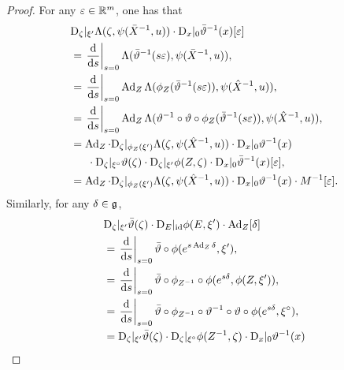 \documentclass{article}
\newcommand\at[2]{\left.#1\right|_{#2}}
\newcommand{\dds}{\frac{\td}{\td s}}
\begin{document}
\begin{proof}
For any $\varepsilon \in \mathbb{R}^m$, one has that
\begin{align*}
    &\tD_{\zeta}|_{\xi'} \Lambda(\zeta, \psi(\bar{X}^{-1}, u)) \cdot \tD_x |_0 \bar{\vartheta}^{-1}(x) [\varepsilon] \\
    &= \at{\dds}{s=0} \Lambda(\bar{\vartheta}^{-1}(s\varepsilon), \psi(\bar{X}^{-1}, u)), \\
    &= \at{\dds}{s=0} \Ad_Z \Lambda(\phi_{Z}(\bar{\vartheta}^{-1}(s\varepsilon)), \psi(\hat{X}^{-1}, u)), \\
    &= \at{\dds}{s=0} \Ad_Z \Lambda(\vartheta^{-1} \circ \vartheta \circ \phi_{Z}(\bar{\vartheta}^{-1}(s\varepsilon)), \psi(\hat{X}^{-1}, u)), \\
    &= \Ad_Z \cdot \tD_{\zeta}|_{\phi_Z(\xi')} \Lambda(\zeta, \psi(\hat{X}^{-1}, u)) \cdot
    \tD_x|_0 \vartheta^{-1} (x) 
    \\ &\phantom{==}
    \cdot \tD_\zeta |_{\mr{\xi}} \vartheta(\zeta) \cdot \tD_\zeta | _{\xi'} \phi(Z, \zeta) \cdot \tD_x |_0 \bar{\vartheta}^{-1}(x)[\varepsilon]
    , \\
    &= \Ad_Z \cdot \tD_{\zeta}|_{\phi_Z(\xi')} \Lambda(\zeta, \psi(\hat{X}^{-1}, u)) \cdot
    \tD_x|_0 \vartheta^{-1} (x) \cdot M^{-1} [\varepsilon].
\end{align*}
Similarly, for any $\delta \in \mathfrak{g}$,
\begin{align*}
    &\tD_\zeta |_{\xi'} \bar{\vartheta}(\zeta) \cdot \tD_E |_\id \phi(E, \xi') \cdot \Ad_Z [\delta] \\
    &= \at{\dds}{s=0} \bar{\vartheta} \circ \phi(e^{s\Ad_Z \delta}, \xi'), \\
    &= \at{\dds}{s=0} \bar{\vartheta} \circ \phi_{Z^{-1}} \circ \phi(e^{s \delta}, \phi(Z , \xi')), \\
    &= \at{\dds}{s=0} \bar{\vartheta} \circ \phi_{Z^{-1}} \circ \vartheta^{-1} \circ \vartheta \circ \phi(e^{s \delta}, \mr{\xi}), \\
    &= \tD_\zeta |_{\xi'} \bar{\vartheta}(\zeta)
    \cdot \tD_\zeta |_{\mr{\xi}} \phi(Z^{-1}, \zeta)
    \cdot \tD_x|_0 \vartheta^{-1}(x)

\end{align*}
\end{proof}
\end{document}
